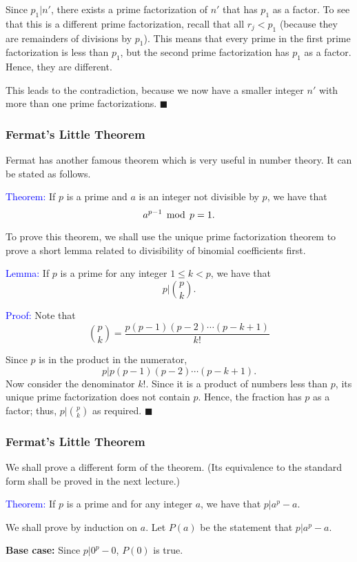 \begin{frame}
  \begin{tcolorbox}[title=Proof (cont.)]
  Since $p_1|n'$, there exists a prime factorization of $n'$ that has
  $p_1$ as a factor.  To see that this is a different prime
  factorization, recall that all $r_j < p_1$ (because they are
  remainders of divisions by $p_1$).  This means that every prime in
  the first prime factorization is less than $p_1$, but the second
  prime factorization has $p_1$ as a factor.  Hence, they are
  different.

  \vspace{0.1in} This leads to the contradiction, because we now have
  a smaller integer $n'$ with more than one prime
  factorizations. $\blacksquare$
  \end{tcolorbox}
\end{frame}

\begin{frame}\frametitle{Fermat's Little Theorem}
  Fermat has another famous theorem which is very useful in number
  theory.  It can be stated as follows.

  \begin{tcolorbox}
    \textcolor{blue}{Theorem:} If $p$ is a prime and $a$ is an integer
    not divisible by $p$, we have that
    \[ a^{p-1}\,\bmod\, p = 1. \]
  \end{tcolorbox}

  To prove this theorem, we shall use the unique prime factorization
  theorem to prove a short lemma related to divisibility of binomial
  coefficients first.
\end{frame}

\begin{frame}
  \textcolor{blue}{Lemma:} If $p$ is a prime for any integer $1\leq
  k<p$, we have that
  \[
  p\Big|\binom{p}{k}.
  \]

  \textcolor{blue}{Proof:}  Note that
  \[\binom{p}{k}=\frac{p(p-1)(p-2)\cdots(p-k+1)}{k!}\]

  Since $p$ is in the product in the numerator,
  \[
  p|p(p-1)(p-2)\cdots(p-k+1).
  \]
  Now consider the denominator $k!$.
  Since it is a product of numbers less than $p$, its unique prime
  factorization does not contain $p$.  Hence, the fraction has $p$ as
  a factor; thus, $p|\binom{p}{k}$ as required. $\blacksquare$
\end{frame}

\begin{frame}\frametitle{Fermat's Little Theorem}
  We shall prove a different form of the theorem. (Its equivalence to
  the standard form shall be proved in the next lecture.)

  \begin{tcolorbox}
    \textcolor{blue}{Theorem:} If $p$ is a prime and for any integer
    $a$, we have that $p|a^p-a$.
  \end{tcolorbox}
  \begin{tcolorbox}[title=Proof]
    We shall prove by induction on $a$.  Let $P(a)$ be the statement
    that $p|a^p-a$.

    {\bf Base case:} Since $p|0^p-0$, $P(0)$ is true.
  \end{tcolorbox}
\end{frame}

